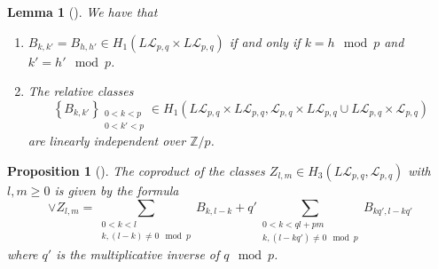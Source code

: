 \documentclass[reqno]{amsart}
\newtheorem{lemma}[theorem]{Lemma}
\newtheorem{proposition}[theorem]{Proposition}
\theoremstyle{definition}
\theoremstyle{remark}
\begin{document}
\begin{lemma}[]\cite[Lemma 2.7]{Naef-Rivera-Wahl}
    We have that
    \begin{enumerate}
        \item $B_{k,k'} = B_{h,h'} \in 
            H_1 \left( L \mathcal{L}_{p,q} \times 
            L \mathcal{L}_{p,q} \right) $ if and only if
            $k = h \mod{p}$ and
            $k' = h' \mod{p}$.
        \item The relative classes
            \[
                \left\{ B_{k,k'} \right\}_{\substack{0 < k < p \\ 0 < k' <p}}
                \in H_1 \left( L \mathcal{L}_{p,q} \times 
                L \mathcal{L}_{p,q}, \mathcal{L}_{p,q}
            \times L \mathcal{L}_{p,q} \cup 
        L \mathcal{L}_{p,q} \times \mathcal{L}_{p,q} \right) 
            \] 
            are linearly independent over $\mathbb{Z}/p$.
    \end{enumerate}
\end{lemma}


\begin{proposition}[]\cite[Proposition 2.8]{Naef-Rivera-Wahl}
    The coproduct of the classes $Z_{l,m} \in H_3 \left( L \mathcal{L}_{p,q},
    \mathcal{L}_{p,q} \right) $ with $l,m \ge 0$ is given by
    the formula
    \[
    \vee Z_{l,m} = 
    \sum_{\substack{0 < k < l \\ k, (l-k) \neq 0 \mod{p}}}
    B_{k,l-k} + q' 
    \sum_{\substack{0 < k < ql+pm \\ k,(l-kq')\neq 0 \mod{p}}}
    B_{kq', l-kq'}
    \] 
    where $q'$ is the multiplicative inverse of $q \mod{p}$.
\end{proposition}
\end{document}
